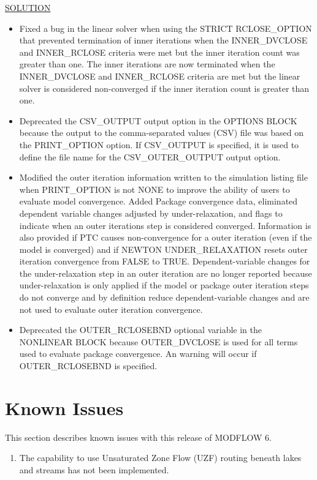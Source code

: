 \documentclass[11pt,twoside,twocolumn]{usgsreport}
\begin{document}
\begin{itemize}
	\underline{SOLUTION}
	\begin{itemize}
		\item Fixed a bug in the linear solver when using the STRICT RCLOSE\_OPTION that prevented termination of inner iterations when the INNER\_DVCLOSE and INNER\_RCLOSE criteria were met but the inner iteration count was greater than one. The inner iterations are now terminated when the INNER\_DVCLOSE and INNER\_RCLOSE criteria are met but the linear solver is considered non-converged if the inner iteration count is greater than one.
		\item Deprecated the CSV\_OUTPUT output option in the OPTIONS BLOCK because the output to the comma-separated values (CSV) file was based on the PRINT\_OPTION option. If CSV\_OUTPUT is specified, it is used to define the file name for the CSV\_OUTER\_OUTPUT output option.
		\item Modified the outer iteration information written to the simulation listing file when PRINT\_OPTION is not NONE to improve the ability of users to evaluate model convergence. Added Package convergence data, eliminated dependent variable changes adjusted by under-relaxation, and flags to indicate when an outer iterations step is considered converged. Information is also provided if PTC causes non-convergence for a outer iteration (even if the model is converged) and if NEWTON UNDER\_RELAXATION resets outer iteration convergence from FALSE to TRUE. Dependent-variable changes for the under-relaxation step in an outer iteration are no longer reported because under-relaxation is only applied if the model or package outer iteration steps do not converge and by definition reduce dependent-variable changes and are not used to evaluate outer iteration convergence.
		\item Deprecated the OUTER\_RCLOSEBND optional variable in the NONLINEAR BLOCK because OUTER\_DVCLOSE is used for all terms used to evaluate package convergence. An warning will occur if OUTER\_RCLOSEBND is specified.
	\end{itemize}

\end{itemize}


\section{Known Issues}
This section describes known issues with this release of MODFLOW 6.

\begin{enumerate}

\item
The capability to use Unsaturated Zone Flow (UZF) routing beneath lakes and streams has not been implemented.

\end{enumerate}
\end{document}
